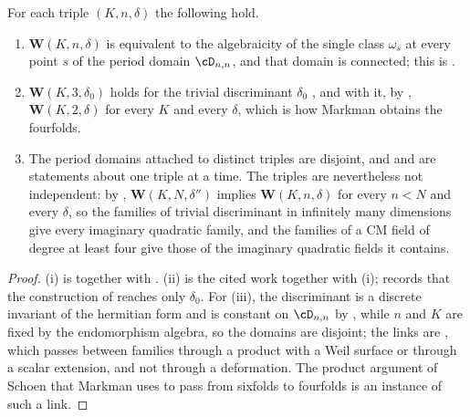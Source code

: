 \begin{proposition}\label{prop:separate}
For each triple $(K,n,\delta)$ the following hold.
\begin{enumerate}[label=\textup{(\roman*)},leftmargin=2.6em]
\item $\mathbf{W}(K,n,\delta)$ is equivalent to the algebraicity of the single
  class $\omega_{s}$ at every point $s$ of the period domain $\cD_{n,n}$, and
  that domain is connected; this is \cite[Corollary~15.35]{paperI}.
\item $\mathbf{W}(K,3,\delta_{0})$ holds for the trivial discriminant
  $\delta_{0}$ \cite{Mar25a,Mar25b}, and with it, by ,
  $\mathbf{W}(K,2,\delta)$ for every $K$ and every $\delta$, which is how
  Markman obtains the fourfolds.
\item The period domains attached to distinct triples are disjoint, and
  \cite[Theorem~15.14]{paperI} and \cite[Corollary~15.35]{paperI} are statements about one
  triple at a time. The triples are nevertheless not independent: by
  , $\mathbf{W}(K,N,\delta'')$ implies
  $\mathbf{W}(K,n,\delta)$ for every $n<N$ and every $\delta$, so the families
  of trivial discriminant in infinitely many dimensions give every imaginary
  quadratic family, and the families of a CM field of degree at least four
  give those of the imaginary quadratic fields it contains.
\end{enumerate}
\end{proposition}

\begin{proof}
(i) is \cite[Corollary~15.35]{paperI} together with \cite[Proposition~B.8]{paperI}. (ii) is the
cited work together with (i); \cite[Remark~15.20]{paperI}
records that the construction of \cite[Section~15.1]{paperI} reaches only $\delta_{0}$.
For (iii), the discriminant is a discrete invariant of the hermitian form and
is constant on $\cD_{n,n}$ by \cite[Proposition~15.19(ii)]{paperI}, while $n$ and $K$ are
fixed by the endomorphism algebra, so the domains are disjoint; the links are
, which passes between families through a product with a
Weil surface or through a scalar extension, and not through a deformation.
The product argument of Schoen that Markman uses to pass from sixfolds to
fourfolds is an instance of such a link.
\end{proof}

